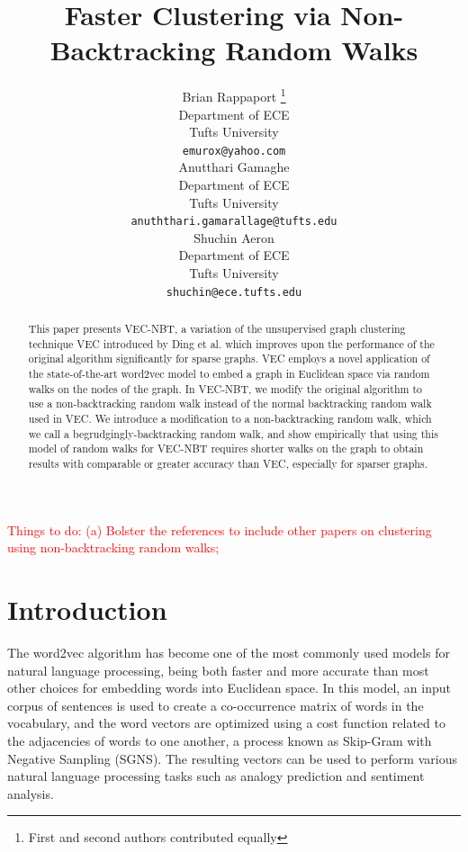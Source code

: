 \documentclass{article} %
\title{Faster Clustering via Non-Backtracking Random Walks}
\author{
Brian Rappaport \thanks{First and second authors contributed equally} \\
Department of ECE\\
Tufts University\\
\texttt{emurox@yahoo.com} \\
\And
Anutthari Gamaghe \\
Department of ECE\\
Tufts University\\
\texttt{anuththari.gamarallage@tufts.edu} \\
\AND
Shuchin Aeron \\
Department of ECE\\
Tufts University\\
\texttt{shuchin@ece.tufts.edu} 
}
\begin{document}
\maketitle

\begin{abstract}
This paper presents VEC-NBT, a variation of the unsupervised graph clustering technique VEC introduced by Ding et al. \cite{NodeEmbed} which improves upon the performance of the original algorithm significantly for sparse graphs. VEC employs a novel application of the state-of-the-art word2vec model \cite{word2vec} to embed a graph in Euclidean space via random walks on the nodes of the graph. In VEC-NBT, we modify the original algorithm to use a non-backtracking random walk instead of the normal backtracking random walk used in VEC. We introduce a modification to a non-backtracking random walk, which we call a begrudgingly-backtracking random walk, and show empirically that using this model of random walks for VEC-NBT requires shorter walks on the graph to obtain results with comparable or greater accuracy than VEC, especially for sparser graphs.
\end{abstract}

\textcolor{red}{Things to do: (a) Bolster the references to include other papers on clustering using non-backtracking random walks;}

\section{Introduction}

The word2vec algorithm \cite{word2vec} has become one of the most commonly used models for natural language processing, being both faster and more accurate than most other choices for embedding words into Euclidean space. In this model, an input corpus of sentences is used to create a co-occurrence matrix of words in the vocabulary, and the word vectors are optimized using a cost function related to the adjacencies of words to one another, a process known as Skip-Gram with Negative Sampling (SGNS). The resulting vectors can be used to perform various natural language processing tasks such as analogy prediction and sentiment analysis.
\end{document}
